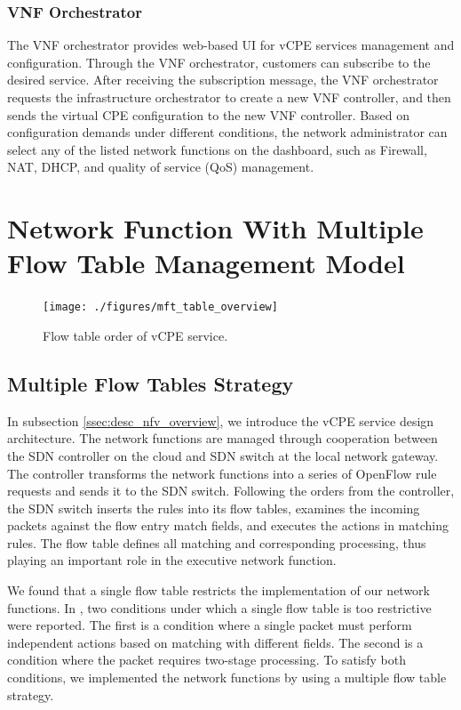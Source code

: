 \documentclass[conference]{IEEEtran}
\begin{document}
\subsubsection{VNF Orchestrator}
The VNF orchestrator provides web-based UI for vCPE services management and configuration. Through the VNF orchestrator, customers can subscribe to the desired service. After receiving the subscription message, the VNF orchestrator requests the infrastructure orchestrator to create a new VNF controller, and then sends the virtual CPE configuration to the new VNF controller. Based on configuration demands under different conditions, the network administrator can select any of the listed network functions on the dashboard, such as Firewall, NAT, DHCP, and quality of service (QoS) management.





\section{Network Function With Multiple Flow Table Management Model} \label{sec:mft}

\begin{figure}[!t]
\centering
\texttt{[image: ./figures/mft\_table\_overview]}
\caption{Flow table order of vCPE service.}
\label{fig:mft_table_overview}
\end{figure}



\subsection{Multiple Flow Tables Strategy}
In subsection \ref{ssec:desc_nfv_overview}, we introduce the vCPE service design architecture. The network functions are managed through cooperation between the SDN controller on the cloud and SDN switch at the local network gateway. The controller transforms the network functions into a series of OpenFlow rule requests and sends it to the SDN switch. Following the orders from the controller, the SDN switch inserts the rules into its flow tables, examines the incoming packets against the flow entry match fields, and executes the actions in matching rules. The flow table \cite{sdn-ft} defines all matching and corresponding processing, thus playing an important role in the executive network function.

We found that a single flow table restricts the implementation of our network functions. In \cite{onf-multi-tables}, two conditions under which a single flow table is too restrictive were reported. The first is a condition where a single packet must perform independent actions based on matching with different fields. The second is a condition where the packet requires two-stage processing. To satisfy both conditions, we implemented the network functions by using a multiple flow table strategy.
\end{document}
